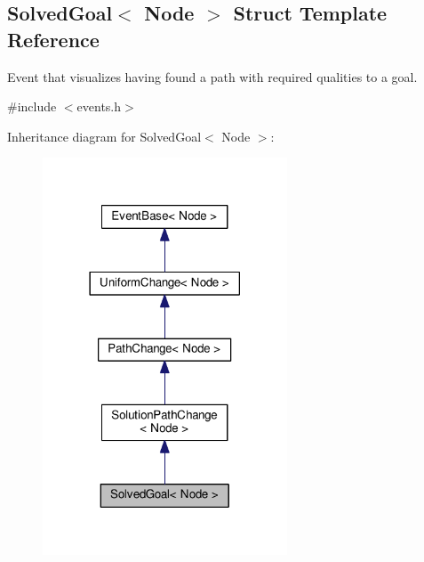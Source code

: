 \hypertarget{structSolvedGoal}{}\subsection{Solved\+Goal$<$ Node $>$ Struct Template Reference}
\label{structSolvedGoal}


Event that visualizes having found a path with required qualities to a goal.  




{\ttfamily \#include $<$events.\+h$>$}



Inheritance diagram for Solved\+Goal$<$ Node $>$\+:\nopagebreak
\begin{figure}[H]
\begin{center}
\leavevmode
\includegraphics[width=206pt]{structSolvedGoal__inherit__graph}
\end{center}
\end{figure}


